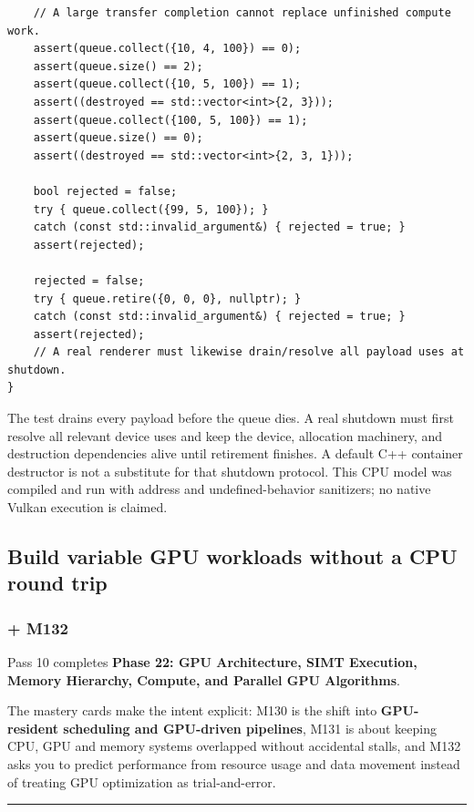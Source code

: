 \begin{verbatim}
    // A large transfer completion cannot replace unfinished compute work.
    assert(queue.collect({10, 4, 100}) == 0);
    assert(queue.size() == 2);
    assert(queue.collect({10, 5, 100}) == 1);
    assert((destroyed == std::vector<int>{2, 3}));
    assert(queue.collect({100, 5, 100}) == 1);
    assert(queue.size() == 0);
    assert((destroyed == std::vector<int>{2, 3, 1}));

    bool rejected = false;
    try { queue.collect({99, 5, 100}); }
    catch (const std::invalid_argument&) { rejected = true; }
    assert(rejected);

    rejected = false;
    try { queue.retire({0, 0, 0}, nullptr); }
    catch (const std::invalid_argument&) { rejected = true; }
    assert(rejected);
    // A real renderer must likewise drain/resolve all payload uses at shutdown.
}
\end{verbatim}

The test drains every payload before the queue dies. A real shutdown must first resolve all relevant device uses and keep the device, allocation machinery, and destruction dependencies alive until retirement finishes. A default C++ container destructor is not a substitute for that shutdown protocol. This CPU model was compiled and run with address and undefined-behavior sanitizers; no native Vulkan execution is claimed.

\subsection{Build variable GPU workloads without a CPU round trip}\label{build-variable-gpu-workloads-without-a-cpu-round-trip}

\subsubsection{+ M132}\label{m132}

Pass 10 completes \textbf{Phase 22: GPU Architecture, SIMT Execution, Memory Hierarchy, Compute, and Parallel GPU Algorithms}.

The mastery cards make the intent explicit: M130 is the shift into \textbf{GPU-resident scheduling and GPU-driven pipelines}, M131 is about keeping CPU, GPU and memory systems overlapped without accidental stalls, and M132 asks you to predict performance from resource usage and data movement instead of treating GPU optimization as trial-and-error.

\begin{center}\rule{0.5\linewidth}{0.5pt}\end{center}


